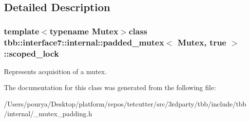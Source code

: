 \subsection{Detailed Description}
\subsubsection*{template$<$typename Mutex$>$class tbb\+::interface7\+::internal\+::padded\+\_\+mutex$<$ Mutex, true $>$\+::scoped\+\_\+lock}

Represents acquisition of a mutex. 

The documentation for this class was generated from the following file\+:\begin{DoxyCompactItemize}
\item 
/\+Users/pourya/\+Desktop/platform/repos/tetcutter/src/3rdparty/tbb/include/tbb/internal/\+\_\+mutex\+\_\+padding.\+h\end{DoxyCompactItemize}

